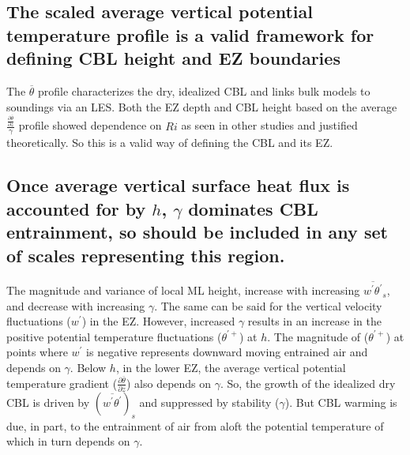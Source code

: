 \subsection{The scaled average vertical potential temperature profile is a valid framework for defining CBL height and EZ boundaries}

The $\overline{\theta}$ profile characterizes the dry, idealized CBL and links bulk models to soundings via an LES.  Both the EZ depth and CBL height based on the average $\frac{\frac{\partial \overline{\theta}}{\partial z}}{\gamma}$ profile showed dependence on $Ri$ as seen in other studies and justified theoretically.  So this is a valid way of defining the CBL and its EZ.  

\subsection{Once average vertical surface heat flux is accounted for by $h$, $\gamma$ dominates CBL entrainment, so should be included in any set of scales representing this region.}

The magnitude and variance of local ML height, increase with increasing $\overline{w^{'}\theta^{'}}_{s}$, and decrease with increasing $\gamma$.  The same can be said for the vertical velocity fluctuations ($w^{'}$) in the EZ.  However, increased $\gamma$ results in an increase in the positive potential temperature fluctuations ($\theta^{'+}$) at $h$. The magnitude of ($\theta^{'+}$) at points where $w^{'}$ is negative represents downward moving entrained air and depends on $\gamma$.  Below $h$, in the lower EZ, the average vertical potential temperature gradient ($\frac{\partial \overline{\theta}}{\partial z}$) also depends on $\gamma$. So, the growth of the idealized dry CBL is driven by $(\overline{w^{'}\theta^{'}})_{s}$ and suppressed by stability ($\gamma$). But CBL warming is due, in part, to the entrainment of air from aloft the potential temperature of which in turn depends on $\gamma$.\\

